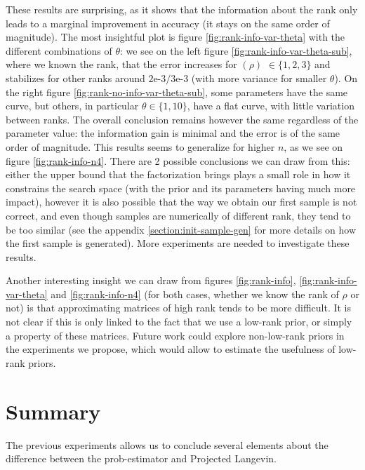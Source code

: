 \documentclass[12pt]{memoir}
\newcommand{\rhorank}[0]{\text{rank}$(\rho) $ }
\begin{document}
These results are surprising, as it shows that the information about the rank only leads to a marginal improvement in accuracy (it stays on the same order of magnitude). The most insightful plot is figure \ref{fig:rank-info-var-theta} with the different combinations of $\theta$: we see on the left figure \ref{fig:rank-info-var-theta-sub}, where we known the rank, that the error increases for \rhorank{$\in \{1,2,3\}$} and stabilizes for other ranks around $2\text{e-}3/3\text{e-}3$ (with more variance for smaller $\theta$). On the right figure \ref{fig:rank-no-info-var-theta-sub}, some parameters have the same curve, but others, in particular $\theta \in\{1,10\}$, have a flat curve, with little variation between ranks. The overall conclusion remains however the same regardless of the parameter value: the information gain is minimal and the error is of the same order of magnitude. This results seems to generalize for higher $n$, as we see on figure \ref{fig:rank-info-n4}. There are 2 possible conclusions we can draw from this: either the upper bound that the factorization brings plays a small role in how it constrains the search space (with the prior and its parameters having much more impact), however it is also possible that the way we obtain our first sample is not correct, and even though samples are numerically of different rank, they tend to be too similar (see the appendix \ref{section:init-sample-gen} for more details on how the first sample is generated). More experiments are needed to investigate these results.\medbreak

Another interesting insight we can draw from figures \ref{fig:rank-info}, \ref{fig:rank-info-var-theta} and \ref{fig:rank-info-n4} (for both cases, whether we know the rank of $\rho$ or not) is that approximating matrices of high rank tends to be more difficult. It is not clear if this is only linked to the fact that we use a low-rank prior, or simply a property of these matrices. Future work could explore non-low-rank priors in the experiments we propose, which would allow to estimate the usefulness of low-rank priors.

\section{Summary}
The previous experiments allows us to conclude several elements about the difference between the prob-estimator and Projected Langevin. \medbreak
\end{document}
